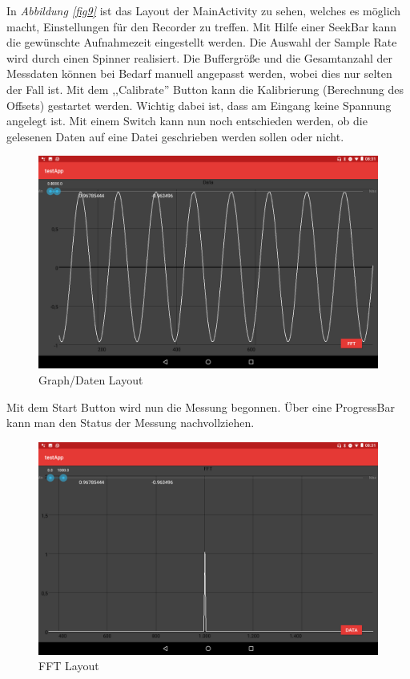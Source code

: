 \documentclass{article}
\begin{document}
{	
		
			In \textit{Abbildung \ref{fig9}} ist das Layout der MainActivity zu sehen, welches es möglich macht, Einstellungen für den Recorder zu treffen. Mit Hilfe einer SeekBar kann die gewünschte Aufnahmezeit eingestellt werden. Die Auswahl der Sample Rate wird durch einen Spinner realisiert. Die Buffergröße und die Gesamtanzahl der Messdaten können bei Bedarf manuell angepasst werden, wobei dies nur selten der Fall ist. Mit dem ,,Calibrate'' Button kann die Kalibrierung (Berechnung des Offsets) gestartet werden. Wichtig dabei ist, dass am Eingang keine Spannung angelegt ist. Mit einem Switch kann nun noch entschieden werden, ob die gelesenen Daten auf eine Datei geschrieben werden sollen oder nicht. 
			
			\begin{figure}
				\includegraphics[scale=0.15]{Bilder/Screenshot_20180327-083120.png}
				\centering
				\vspace{0 cm}
				\caption{Graph/Daten Layout}
				\label{fig10}	
			\end{figure}
		
		
			
			Mit dem Start Button wird nun die Messung begonnen. Über eine ProgressBar kann man den Status der Messung nachvollziehen.
			
			\begin{figure}
				\includegraphics[scale=0.15]{Bilder/Screenshot_20180327-083144.png}
				\centering
				\vspace{0 cm}
				\caption{FFT Layout}
				\label{fig11}	
			\end{figure}
			
}
\end{document}
